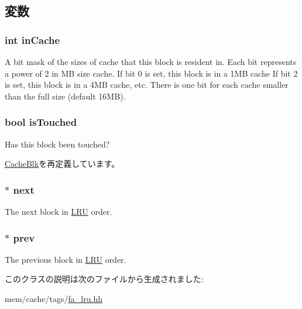\subsection{変数}
\hypertarget{classFALRUBlk_ac6da16cc60d372d1160776a7dbd19225}{
\subsubsection[{inCache}]{\setlength{\rightskip}{0pt plus 5cm}int {\bf inCache}}}
\label{classFALRUBlk_ac6da16cc60d372d1160776a7dbd19225}
A bit mask of the sizes of cache that this block is resident in. Each bit represents a power of 2 in MB size cache. If bit 0 is set, this block is in a 1MB cache If bit 2 is set, this block is in a 4MB cache, etc. There is one bit for each cache smaller than the full size (default 16MB). \hypertarget{classFALRUBlk_a0d3f1758bf7fdcec892f211bf3553d4f}{
\subsubsection[{isTouched}]{\setlength{\rightskip}{0pt plus 5cm}bool {\bf isTouched}}}
\label{classFALRUBlk_a0d3f1758bf7fdcec892f211bf3553d4f}
Has this block been touched? 

\hyperlink{classCacheBlk_a0d3f1758bf7fdcec892f211bf3553d4f}{CacheBlk}を再定義しています。\hypertarget{classFALRUBlk_a6052859e7b0dcb984d30d81644b0b0bc}{
\subsubsection[{next}]{$\ast$ {\bf next}}}
\label{classFALRUBlk_a6052859e7b0dcb984d30d81644b0b0bc}
The next block in \hyperlink{classLRU}{LRU} order. \hypertarget{classFALRUBlk_a60858281b4339d5562be6944b874b4a3}{
\subsubsection[{prev}]{$\ast$ {\bf prev}}}
\label{classFALRUBlk_a60858281b4339d5562be6944b874b4a3}
The previous block in \hyperlink{classLRU}{LRU} order. 

このクラスの説明は次のファイルから生成されました:\begin{DoxyCompactItemize}
\item 
mem/cache/tags/\hyperlink{fa__lru_8hh}{fa\_\-lru.hh}\end{DoxyCompactItemize}
